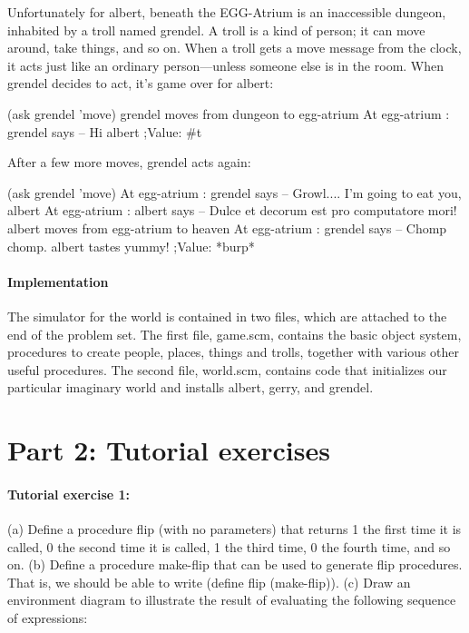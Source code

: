 Unfortunately for {\cf albert}, beneath the EGG-Atrium is an inaccessible
dungeon, inhabited by a troll named {\cf grendel}.  A troll is a
kind of person; it can move around, take 
things, and so on.  When a troll gets a {\cf  move} message from the clock,
it acts just like an ordinary person---unless someone else is in the
room.  When {\cf grendel} decides to {\cf act}, it's game over for {\cf albert}:

\beginlisp
(ask grendel 'move)
grendel moves from dungeon to egg-atrium 
At egg-atrium : grendel says -- Hi albert
;Value: \#t
\endlisp 

After a few more moves, {\cf grendel} acts again:

\beginlisp
(ask grendel 'move)
At egg-atrium : grendel says -- Growl.... I'm going to eat you, albert 
At egg-atrium : albert says -- 
                   Dulce et decorum est 
                   pro computatore mori! 
albert moves from egg-atrium to heaven 
At egg-atrium : grendel says -- Chomp chomp. albert tastes yummy! 
;Value: *burp*
\endlisp

\paragraph{Implementation}

The simulator for the world is contained in two files, which are
attached to the end of the problem set. The first file, {\cf
game.scm}, contains the basic object system, procedures to create
people, places, things and trolls, together with various other useful
procedures.  The second file, {\cf world.scm}, contains code that
initializes our particular imaginary world and installs {\cf albert},
{\cf gerry}, and {\cf grendel}.

\section{Part 2: Tutorial exercises}

\paragraph{Tutorial exercise 1:}

(a) Define a procedure {\cf flip} (with no parameters) that returns 1
the first time it is called, 0 the second time it is called, 1 the
third time, 0 the fourth time, and so on.  (b) Define a procedure {\cf
make-flip} that can be used to generate {\cf flip} procedures.  That
is, we should be able to write {\cf (define flip (make-flip))}.  (c)
Draw an environment diagram to illustrate the result of evaluating the
following sequence of expressions:


